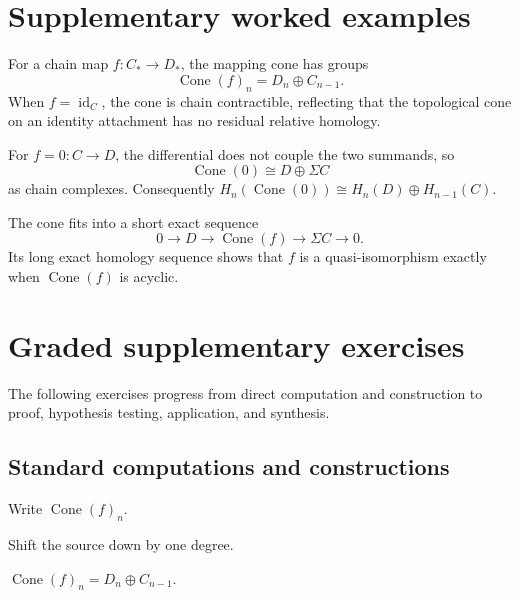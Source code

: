 \section{Supplementary worked examples}
\label{sec:viii24-pedagogy}

\begin{example}\label{ex:viii24-ped-01}
For a chain map $f:C_*\to D_*$, the mapping cone has groups
\[
\operatorname{Cone}(f)_n=D_n\oplus C_{n-1}.
\]
When $f=\operatorname{id}_C$, the cone is chain contractible, reflecting that the topological cone on an identity attachment has no residual relative homology.
\end{example}

\begin{example}\label{ex:viii24-ped-02}
For $f=0:C\to D$, the differential does not couple the two summands, so
\[
\operatorname{Cone}(0)\cong D\oplus \Sigma C
\]
as chain complexes. Consequently $H_n(\operatorname{Cone}(0))\cong H_n(D)\oplus H_{n-1}(C)$.
\end{example}

\begin{example}\label{ex:viii24-ped-03}
The cone fits into a short exact sequence
\[
0\to D\to\operatorname{Cone}(f)\to\Sigma C\to0.
\]
Its long exact homology sequence shows that $f$ is a quasi-isomorphism exactly when $\operatorname{Cone}(f)$ is acyclic.
\end{example}

\section{Graded supplementary exercises}
The following exercises progress from direct computation and construction to proof, hypothesis testing, application, and synthesis.

\subsection*{Standard computations and constructions}

\begin{exercise}\label{exr:viii24-ped-01}
Write $\operatorname{Cone}(f)_n$.
\end{exercise}
\begin{hint}
Shift the source down by one degree.
\end{hint}
\begin{solution}
$\operatorname{Cone}(f)_n=D_n\oplus C_{n-1}$.
\end{solution}

